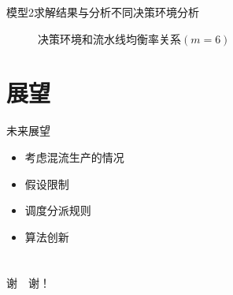 \documentclass{beamer}
\begin{document}
\begin{frame}{模型2求解结果与分析}{不同决策环境分析}
\begin{figure}
\centering
{}
\caption{决策环境和流水线均衡率关系$(m = 6)$}
\end{figure}
\end{frame}
\section{展望}
\begin{frame}{未来展望}
\begin{itemize}[<+-| alert@+>]
\item 考虑混流生产的情况
\item 假设限制
\item 调度分派规则
\item 算法创新
\end{itemize}
\end{frame}
\section{ }
\begin{frame}
\centering
{}
谢~~谢！
\end{frame}
\end{document}
